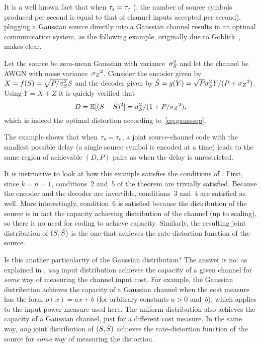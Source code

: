 It is a well known fact that when ${\tau_s} = {\tau_c}$ (\ie, the number of source symbols
produced per second is equal to that of channel inputs accepted per second),
plugging a Gaussian source directly into a Gaussian channel results in an
optimal communication system, as the following example, originally due to
Goblick~\cite{Goblick1965}, makes clear.

\begin{example}
  \label{ex:gausssingle}
  Let the source be zero-mean Gaussian with variance~${\sigma_S^2}$ and let the channel
  be AWGN with noise variance~${{\sigma_Z}^2}$. Consider the encoder given by $X =
  f(S) = \sqrt{P/{\sigma_S^2}} S$ and the decoder given by ${\hat{S}} = g(Y) = \sqrt{P}
  {\sigma_S^2} Y / (P + {{\sigma_Z}^2})$. Using $Y = X + Z$ it is quickly verified that
  \begin{equation*}
    D = \mathbb{E}[(S - {\hat{S}})^2] = {\sigma_S^2} / (1 + P/{{\sigma_Z}^2}),
  \end{equation*}
  which is indeed the optimal distortion according to~\eqref{eq:gausssep}.
\end{example}

The example shows that when ${\tau_s} = {\tau_c}$, a joint source-channel code with the
smallest possible delay (a single source symbol is encoded at a time) leads to
the same region of achievable $(D,P)$ pairs as when the delay is unrestricted.

It is instructive to look at how this example satisfies the conditions of
. First, since $k = n = 1$, conditions~2 and~5 of
the theorem are trivially satisfied. Because the encoder and the decoder are
invertible, conditions~3 and~4 are satisfied as well. More interestingly,
condition~6 is satisfied because the distribution of the source is in fact the
capacity achieving distribution of the channel (up to scaling), so there is no
need for coding to achieve capacity. Similarly, the resulting joint distribution
of $(S, {\hat{S}})$ is the one that achieves the rate-distortion function of the
source.

Is this another particularity of the Gaussian distribution? The answer is no: as
explained in , \emph{any} input distribution achieves
the capacity of a given channel for \emph{some} way of measuring the channel
input cost. For example, the Gaussian distribution achieves the capacity of a
Gaussian channel when the cost measure has the form $\rho(x) = ax + b$ (for
arbitrary constants $a > 0$ and~$b$), which applies to the input power measure
used here. The uniform distribution also achieves the capacity of a Gaussian
channel, just for a different cost measure. In the same way, \emph{any} joint
distribution of $(S, {\hat{S}})$ achieves the rate-distortion function of the source
for \emph{some} way of measuring the distortion. 

